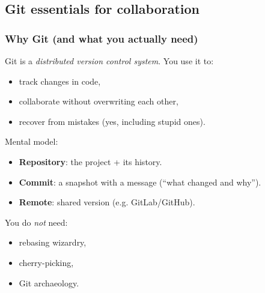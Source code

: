 


\subsection{Git essentials for collaboration}

\begin{frame}
  \frametitle{Why Git (and what you actually need)}
  Git is a \emph{distributed version control system}.
  You use it to:
  \begin{itemize}
    \item track changes in code,
    \item collaborate without overwriting each other,
    \item recover from mistakes (yes, including stupid ones).
  \end{itemize}

  \vspace{0.5em}
  Mental model:
  \begin{itemize}
    \item \textbf{Repository}: the project + its history.
    \item \textbf{Commit}: a snapshot with a message (“what changed and why”).
    \item \textbf{Remote}: shared version (e.g. GitLab/GitHub).
  \end{itemize}

  You do \emph{not} need:
  \begin{itemize}
    \item rebasing wizardry,
    \item cherry-picking,
    \item Git archaeology.
  \end{itemize}
\end{frame}

